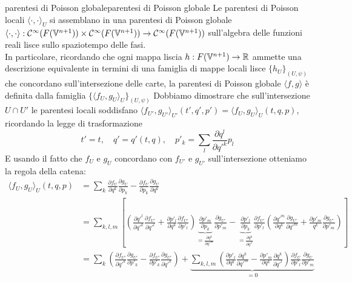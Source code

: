 \documentclass[openany]{book}
\renewcommand\C{\mc{C}}
\renewcommand\V{\mathbb{V}}
\begin{document}
\begin{proposition}{parentesi di Poisson globale}{parentesi di Poisson globale}
    Le parentesi di Poisson locali $\langle\cdot, \cdot\rangle_U$ si assemblano in una parentesi di Poisson globale $\langle\cdot,\cdot\rangle:\C^\infty (F(\V^{n+1}))\times \C^\infty (F(\V^{n+1})) \to \C^\infty (F(\V^{n+1}))$ sull'algebra delle funzioni reali lisce sullo spaziotempo delle fasi.\\
    In particolare, ricordando che ogni mappa liscia $h:F(\V^{n+1})\to \R$ ammette una descrizione equivalente in termini di una famiglia di mappe locali lisce $\{h_U\}_{(U,\psi)}$ che concordano sull'intersezione delle carte, la parentesi di Poisson globale $\langle f,g\rangle$ è definita dalla famiglia $\{ \langle f_U, g_U\rangle_U \}_{(U,\psi)}$
    \proof 
    Dobbiamo dimostrare che sull'intersezione $U\cap U'$ le parentesi locali soddisfano $\langle f_{U'}, g_{U'} \rangle_{U'}(t',q',p') = \langle f_U, g_U\rangle_U(t,q,p)$, ricordando la legge di trasformazione 
    \[ t' = t, \quad q' = q'(t,q), \quad p'_k = \sum_l \frac{\partial q^l}{\partial q'^k}p_l \]
    E usando il fatto che $f_U$ e $g_U$ concordano con $f_{U'}$ e $g_{U'}$ sull'intersezione otteniamo la regola della catena:
    \begin{align*}
        \langle f_U, g_U\rangle_U(t,q,p) & = \sum_k \frac{ \partial f_U }{\partial q^k} \frac{\partial g_U}{\partial p_k} - \frac{\partial f_U}{\partial p_k}\frac{\partial g_U}{\partial q^k} \\
        & = \sum_{k,l,m} \left[ \left( \frac{\partial q'^l}{\partial q'^k} \frac{\partial f_{U'}}{\partial q'^l} + \frac{\partial p'_l}{\partial q^k}\frac{\partial f_{U'}}{\partial p'_l} \right)\underbrace{\frac{\partial p'_m}{\partial p_k}}_{= \frac{\partial q^k}{\partial q'^m}}\frac{\partial g_{U'} }{\partial p'_m} - \underbrace{\frac{\partial p'_l}{\partial p_k}}_{=\frac{\partial q^k}{\partial q'^l}}\frac{\partial f_{U'}}{\partial p'_l}\left( \frac{ \partial q'^m }{\partial q^k} \frac{\partial g_{U'}}{\partial q'^m} + \frac{\partial p'_m}{q^k}\frac{\partial g_{U'}}{\partial p'_m} \right) \right] \\
        & = \sum_k \left(\frac{ \partial f_{U'} }{\partial q'^k} \frac{\partial g_{U'}}{\partial p'_k} - \frac{\partial f_{U'}}{\partial p'_k}\frac{\partial g_{U'}}{\partial q'^k}\right) + \underbrace{\sum_{k,l,m} \left( \frac{\partial p'_l}{\partial q^k}\frac{\partial q^k}{\partial q'^m}- \frac{\partial p'_m}{\partial q^k}\frac{\partial q^k}{\partial q'^l} \right)\frac{\partial f_U}{\partial p'_l}\frac{\partial g_U}{\partial p'_m}}_{= 0} \\

\end{align*}
\end{proposition}
\end{document}
